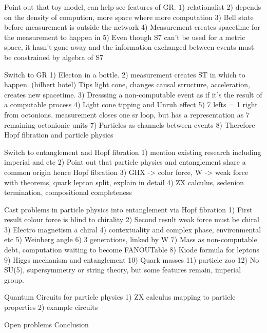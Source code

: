 \documentclass{article}
\begin{document}
Point out that toy model, can help see features of GR.
1) relationalist
2) depends on the density of compution, more space where more computation
3) Bell state before measurement is outside the network
4) Measurement creates spacetime for the measurement to happen in
5) Even though S7 can't be used for a metric space, it hasn't gone away and the information exchanged between events must be constrained by algebra of S7

Switch to GR
1) Electon in a bottle.
2) measurement creates ST in which to happen. (hilbert hotel) Tips light cone, changes causal structure, acceleration, creates new spacetime.
3) Dresssing a non-computable event as if it's the result of a computable process
4) Light cone tipping and Unruh effect
5) 7 lefts = 1 right from octonions. measurement closes one sr loop, but has a representation as 7 remaining octonionic units
7) Particles as channels between events
8) Therefore Hopf fibration and particle physics

Switch to entanglement and Hopf fibration
1) mention existing research including imperial and etc
2) Point out that particle physics and entanglement share a common origin hence Hopf fibration
3) GHX -> color force, W -> weak force with theorems, quark lepton split, explain in detail
4) ZX calculus, sedenion termination, compositional completeness

Cast problems in particle physics into entanglement via Hopf fibration
1) First result colour force is blind to chirality
2) Second result weak force must be chiral
3) Electro magnetism a chiral
4) contextuality and complex phase, environmental etc
5) Weinberg angle
6) 3 generations, linked by W
7) Mass as non-computable debt, computation waiting to become FANOUTable
8) Kiode formula for leptons
9) Higgs mechanism and entanglement
10) Quark masses
11) particle zoo
12) No SU(5), supersymmetry or string theory, but some features remain, imperial group. 

Quantum Circuits for particle physics
1) ZX calculus mapping to particle properties
2) example circuits

Open problems
Conclusion
\printbibliography
\end{document}
